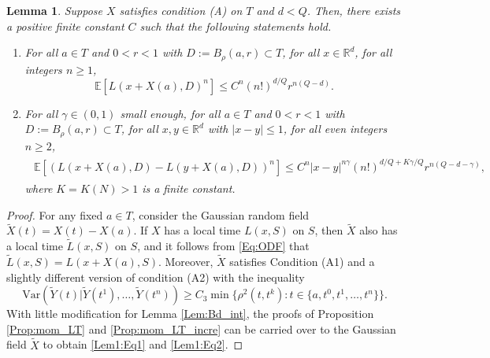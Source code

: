 \documentclass[11pt, reqno]{amsart}
\newtheorem{lemma}[theorem]{Lemma}
\def\R{{\mathbb R}}
\def\E{{\mathbb E}}
\numberwithin{equation}{section}
\begin{document}
\begin{lemma}\label{Lem1}
Suppose $X$ satisfies condition \textup{(A)} on $T$ and $d < Q$.
Then, there exists a positive finite constant $C$ such that the following statements hold.
\begin{enumerate}
\item[(i)] For all $a \in T$ and $0 < r < 1$ with $D:=B_\rho(a, r) \subset T$, for all $x \in \R^d$, for all integers $n \ge 1$, 
\begin{equation}\label{Lem1:Eq1}
\E[L(x + X(a), D)^n] \le C^n (n!)^{d/Q} r^{n(Q-d)}.
\end{equation} 
\item[(ii)] For all $\gamma \in (0, 1)$ small enough, for all $a \in T$ and $0 < r < 1$ with $D:=B_\rho(a, r) \subset T$, 
for all $x, y \in \R^d$ with $|x-y|\le 1$, for all even integers $n \ge 2$, 
\begin{align}
\begin{aligned}\label{Lem1:Eq2}
\E[(L(x + X(a), D) - L(y + X(a), D))^n]
\le C^n |x-y|^{n\gamma} (n!)^{d/Q + K\gamma/Q} r^{n(Q-d-\gamma)},
\end{aligned}
\end{align}
where $K = K(N) > 1$ is a finite constant.
\end{enumerate}
\end{lemma}

\begin{proof}
For any fixed $a \in T$, consider the Gaussian random field $\tilde{X}(t) = X(t) - X(a)$.
If $X$ has a local time $L(x, S)$ on $S$, then $\tilde{X}$ also has a local time $\tilde{L}(x, S)$ on $S$, and it follows 
from \eqref{Eq:ODF} that $\tilde{L}(x, S) = L(x + X(a), S)$. Moreover, $\tilde{X}$ satisfies 
Condition (A1) and a slightly different version of condition (A2) with the inequality
\[ \mathrm{Var}(\tilde{Y}(t)|\tilde{Y}(t^1), \dots, \tilde{Y}(t^n)) \ge C_3 \min\{ \rho^2(t, t^k): t \in \{ a, t^0, t^1, \dots, t^n \} \}. \]
With little modification for Lemma \ref{Lem:Bd_int}, the proofs of Proposition \ref{Prop:mom_LT} and \ref{Prop:mom_LT_incre} 
can be carried over to the Gaussian field $\tilde{X}$ to obtain \eqref{Lem1:Eq1} and \eqref{Lem1:Eq2}.
\end{proof}
\end{document}
